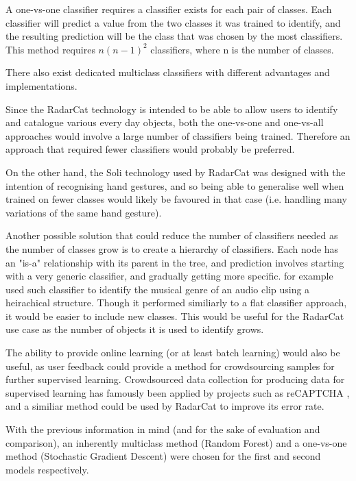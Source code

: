 \documentclass[12pt]{article}
\begin{document}
A one-vs-one classifier requires a classifier exists for each pair of classes. Each classifier will predict a value from the two classes it was trained to identify, and the resulting prediction will be the class that was chosen by the most classifiers. This method requires $n (n - 1)^2$ classifiers, where n is the number of classes.

There also exist dedicated multiclass classifiers with different advantages and implementations.

Since the RadarCat \cite{radarcat} technology is intended to be able to allow users to identify and catalogue various every day objects, both the one-vs-one and one-vs-all approaches would involve a large number of classifiers being trained. Therefore an approach that required fewer classifiers would probably be preferred. 

On the other hand, the Soli \cite{soli} technology used by RadarCat was designed with the intention of recognising hand gestures, and so being able to generalise well when trained on fewer classes would likely be favoured in that case (i.e. handling many variations of the same hand gesture).

Another possible solution that could reduce the number of classifiers needed as the number of classes grow is to create a hierarchy of classifiers. Each node has an "is-a" relationship with its parent in the tree, and prediction involves starting with a very generic classifier, and gradually getting more specific. \cite{heirarchy} for example used such classifier to identify the musical genre of an audio clip using a heirachical structure. Though it performed similiarly to a flat classifier approach, it would be easier to include new classes. This would be useful for the RadarCat use case as the number of objects it is used to identify grows.

The ability to provide online learning (or at least batch learning) would also be useful, as user feedback could provide a method for crowdsourcing samples for further supervised learning. Crowdsourced data collection for producing data for supervised learning has famously been applied by projects such as reCAPTCHA \cite{captcha}, and a similiar method could be used by RadarCat to improve its error rate.

With the previous information in mind (and for the sake of evaluation and comparison), an inherently multiclass method (Random Forest) and a one-vs-one method (Stochastic Gradient Descent) were chosen for the first and second models respectively. 
\end{document}
